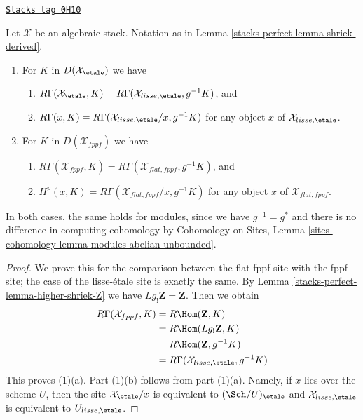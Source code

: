 \begin{lemma}
\label{stacks-perfect-lemma-lisse-etale-cohomology}
\href{https://stacks.math.columbia.edu/tag/0H10}{\texttt{Stacks tag 0H10}}

Let $\mathcal{X}$ be an algebraic stack. Notation as in
Lemma \ref{stacks-perfect-lemma-shriek-derived}.
\begin{enumerate}
\item For $K$ in $D(\mathcal{X}_\etale)$ we have
\begin{enumerate}
\item $R\Gamma(\mathcal{X}_\etale, K) =
R\Gamma(\mathcal{X}_{lisse,\etale}, g^{-1}K)$, and
\item $R\Gamma(x, K) =
R\Gamma(\mathcal{X}_{lisse,\etale}/x, g^{-1}K)$
for any object $x$ of $\mathcal{X}_{lisse,\etale}$.
\end{enumerate}
\item For $K$ in $D(\mathcal{X}_{fppf})$ we have
\begin{enumerate}
\item $R\Gamma(\mathcal{X}_{fppf}, K) =
R\Gamma(\mathcal{X}_{flat,fppf}, g^{-1}K)$, and
\item $H^p(x, K) =
R\Gamma(\mathcal{X}_{flat,fppf}/x, g^{-1}K)$
for any object $x$ of $\mathcal{X}_{flat,fppf}$.
\end{enumerate}
\end{enumerate}
In both cases, the same holds for modules, since we have
$g^{-1} = g^*$ and there is no difference in computing
cohomology by Cohomology on Sites, Lemma
\ref{sites-cohomology-lemma-modules-abelian-unbounded}.
\end{lemma}

\begin{proof}
We prove this for the comparison between the flat-fppf site with the
fppf site; the case of the lisse-\'etale site is exactly the same.
By Lemma \ref{stacks-perfect-lemma-higher-shriek-Z} we have $Lg_!\mathbf{Z} = \mathbf{Z}$.
Then we obtain
\begin{align*}
R\Gamma(\mathcal{X}_{fppf}, K)
& =
R\Hom(\mathbf{Z}, K) \\
& =
R\Hom(Lg_!\mathbf{Z}, K) \\
& =
R\Hom(\mathbf{Z}, g^{-1}K) \\
& =
R\Gamma(\mathcal{X}_{lisse,\etale}, g^{-1}K)
\end{align*}
This proves (1)(a).
Part (1)(b) follows from part (1)(a). Namely, if $x$ lies over the
scheme $U$, then the site $\mathcal{X}_\etale/x$ is equivalent
to $(\Sch/U)_\etale$ and $\mathcal{X}_{lisse,\etale}$ is equivalent
to $U_{lisse, \etale}$.
\end{proof}

